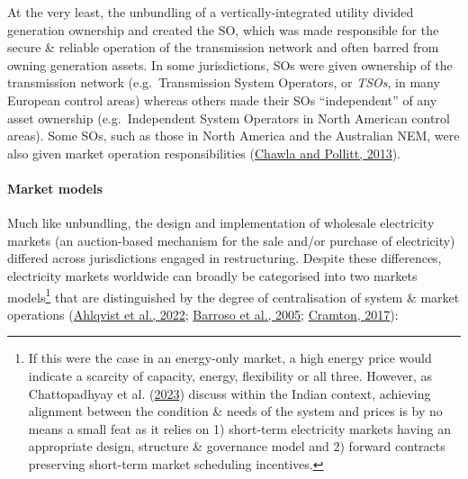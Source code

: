 \documentclass[12pt,a4paper,]{report}
\begin{document}
At the very least, the unbundling of a vertically-integrated utility
divided generation ownership and created the SO, which was made
responsible for the secure \& reliable operation of the transmission
network and often barred from owning generation assets. In some
jurisdictions, SOs were given ownership of the transmission network
(e.g.~Transmission System Operators, or \emph{TSOs}, in many European
control areas) whereas others made their SOs ``independent'' of any
asset ownership (e.g.~Independent System Operators in North American
control areas). Some SOs, such as those in North America and the
Australian NEM, were also given market operation responsibilities
(\protect\hyperlink{ref-chawlaGlobalTrendsElectricity2013}{Chawla and
Pollitt, 2013}).

\hypertarget{market-models}{%
\paragraph{Market models}\label{market-models}}

Much like unbundling, the design and implementation of wholesale
electricity markets (an auction-based mechanism for the sale and/or
purchase of electricity) differed across jurisdictions engaged in
restructuring. Despite these differences, electricity markets worldwide
can broadly be categorised into two markets models\footnote{If this were
  the case in an energy-only market, a high energy price would indicate
  a scarcity of capacity, energy, flexibility or all three. However, as
  Chattopadhyay et al.
  (\protect\hyperlink{ref-chattopadhyaySpotlightSpotMarket2023}{2023})
  discuss within the Indian context, achieving alignment between the
  condition \& needs of the system and prices is by no means a small
  feat as it relies on 1) short-term electricity markets having an
  appropriate design, structure \& governance model and 2) forward
  contracts preserving short-term market scheduling incentives.} that
are distinguished by the degree of centralisation of system \& market
operations
(\protect\hyperlink{ref-ahlqvistSurveyComparingCentralized2022}{Ahlqvist
et al., 2022};
\protect\hyperlink{ref-barrosoClassificationElectricityMarket2005}{Barroso
et al., 2005};
\protect\hyperlink{ref-cramtonElectricityMarketDesign2017}{Cramton,
2017}):
\end{document}
